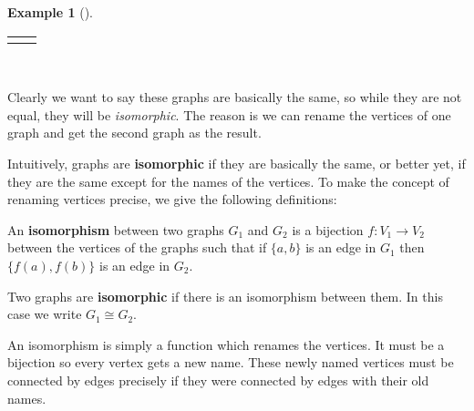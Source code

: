 \documentclass[10pt,]{book}
\newcommand{\terminology}[1]{\textbf{#1}}
\theoremstyle{plain}
\theoremstyle{definition}
\theoremstyle{definition}
\newtheorem{example}[theorem]{Example}
\theoremstyle{definition}
\theoremstyle{definition}
\numberwithin{equation}{chapter}
\newlength{\panelmax}
\newcommand{\isom}{\cong}
\begin{document}
\begin{example}[]
{\setlength{\panelmax}{\maxof{\panelmax}{\phBimage}}
\leavevmode%
\setlength{\tabcolsep}{0.125\linewidth}
\par\medskip\noindent
\hspace*{0.125\linewidth}%
\begin{tabular}{@{}*{2}{c}@{}}
\begin{minipage}[c][\panelmax][b]{0.25\linewidth}\usebox{\panelboxAimage}\end{minipage}&
\begin{minipage}[c][\panelmax][b]{0.25\linewidth}\usebox{\panelboxBimage}\end{minipage}\end{tabular}\\
}%
\par
\hypertarget{p-1493}{}%
Clearly we want to say these graphs are basically the same, so while they are not equal, they will be \emph{isomorphic}. The reason is we can rename the vertices of one graph and get the second graph as the result.%
\end{example}
\hypertarget{p-1494}{}%
Intuitively, graphs are \terminology{isomorphic}  if they are basically the same, or better yet, if they are the same except for the names of the vertices. To make the concept of renaming vertices precise, we give the following definitions:%
\begin{assemblage}\label{assemblage-36}
\hypertarget{p-1495}{}%
 An \terminology{isomorphism} between two graphs \(G_1\) and \(G_2\) is a bijection \(f:V_1 \to V_2\) between the vertices of the graphs such that if \(\{a,b\}\) is an edge in \(G_1\) then \(\{f(a), f(b)\}\) is an edge in \(G_2\).%
\par
\hypertarget{p-1496}{}%
Two graphs are \terminology{isomorphic} if there is an isomorphism between them. In this case we write \(G_1 \isom G_2\).%
\end{assemblage}
\hypertarget{p-1497}{}%
An isomorphism is simply a function which renames the vertices. It must be a bijection so every vertex gets a new name. These newly named vertices must be connected by edges precisely if they were connected by edges with their old names.%
\end{document}
